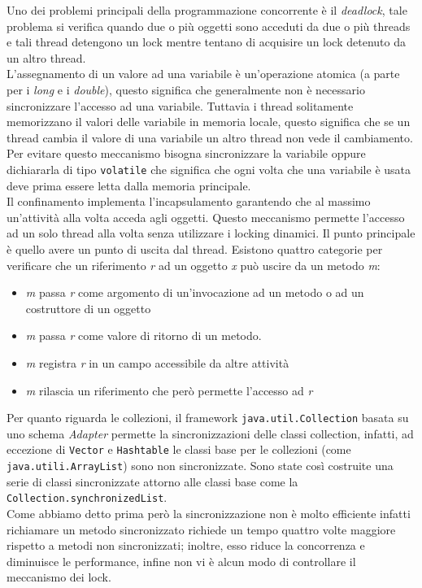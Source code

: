 Uno dei problemi principali della programmazione concorrente è il \emph{deadlock}, tale problema si verifica quando due o più oggetti sono acceduti da due o più threads e tali thread detengono un lock mentre tentano di acquisire un lock detenuto da un altro thread.\\
L'assegnamento di un valore ad una variabile è un'operazione atomica (a parte per i \emph{long} e i \emph{double}), questo significa che generalmente non è necessario sincronizzare l'accesso ad una variabile. Tuttavia i thread solitamente memorizzano il valori delle variabile in memoria locale, questo significa che se un thread cambia il valore di una variabile un altro thread non vede il cambiamento. Per evitare questo meccanismo bisogna sincronizzare la variabile oppure dichiararla di tipo \texttt{volatile} che significa che ogni volta che una variabile è usata deve prima essere letta dalla memoria principale.\\
Il confinamento implementa l'incapsulamento garantendo che al massimo un'attività alla volta acceda agli oggetti. Questo meccanismo permette l'accesso ad un solo thread alla volta senza utilizzare i locking dinamici.
Il punto principale è quello avere un punto di uscita dal thread. Esistono quattro categorie per verificare che un riferimento \emph{r} ad un oggetto \emph{x} può uscire da un metodo \emph{m}:
\begin{itemize}
\item \emph{m} passa \emph{r} come argomento di un'invocazione ad un metodo o ad un costruttore di un oggetto
\item \emph{m} passa \emph{r} come valore di ritorno di un metodo.
\item \emph{m} registra \emph{r} in un campo accessibile da altre attività
\item \emph{m} rilascia un riferimento che però permette l'accesso ad \emph{r}
\end{itemize}
Per quanto riguarda le collezioni, il framework \texttt{java.util.Collection}  basata su uno schema \emph{Adapter} permette la sincronizzazioni delle classi collection, infatti, ad eccezione di \texttt{Vector} e \texttt{Hashtable} le classi base per le collezioni (come \texttt{java.utili.ArrayList}) sono non sincronizzate. Sono state così costruite una serie di classi sincronizzate attorno alle classi base come la \texttt{Collection.synchronizedList}.\\
Come abbiamo detto prima però la sincronizzazione non è molto efficiente infatti richiamare un metodo sincronizzato richiede un tempo quattro volte maggiore rispetto a metodi non sincronizzati; inoltre, esso riduce la concorrenza e diminuisce le performance, infine non vi è alcun modo di controllare il meccanismo dei lock.\\
